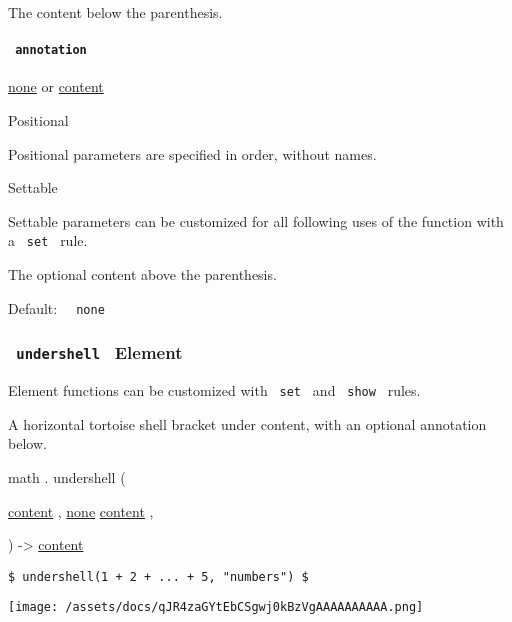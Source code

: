 The content below the parenthesis.

\paragraph{\texorpdfstring{\texttt{\ annotation\ }}{ annotation }}\label{functions-overparen-annotation}

\href{/docs/reference/foundations/none/}{none} {or}
\href{/docs/reference/foundations/content/}{content}

{{ Positional }}

\label{functions-overparen-annotation-positional-tooltip}
Positional parameters are specified in order, without names.

{{ Settable }}

\label{functions-overparen-annotation-settable-tooltip}
Settable parameters can be customized for all following uses of the
function with a \texttt{\ set\ } rule.

The optional content above the parenthesis.

Default: \texttt{\ }{\texttt{\ none\ }}\texttt{\ }

\subsubsection{\texorpdfstring{\texttt{\ undershell\ } {{ Element
}}}{ undershell   Element }}\label{functions-undershell}

\label{functions-undershell-element-tooltip}
Element functions can be customized with \texttt{\ set\ } and
\texttt{\ show\ } rules.

A horizontal tortoise shell bracket under content, with an optional
annotation below.

math { . } { undershell } (

{ \href{/docs/reference/foundations/content/}{content} , } {
\hyperref[functions-undershell-parameters-annotation]{}
\href{/docs/reference/foundations/none/}{none}
\href{/docs/reference/foundations/content/}{content} , }

) -\textgreater{} \href{/docs/reference/foundations/content/}{content}

\begin{verbatim}
$ undershell(1 + 2 + ... + 5, "numbers") $
\end{verbatim}

\texttt{[image: /assets/docs/qJR4zaGYtEbCSgwj0kBzVgAAAAAAAAAA.png]}

